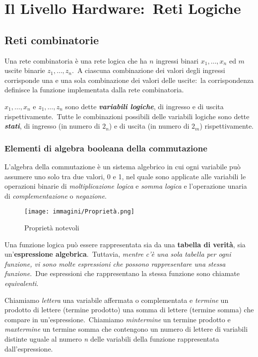 \chapter{Il Livello Hardware:\ Reti Logiche}

\section{Reti combinatorie}

Una rete combinatoria è una rete logica che ha $n$ ingressi binari $x_1, \dots, x_n$ ed $m$ uscite binarie $z_1, \dots, z_n$.\
A ciascuna combinazione dei valori degli ingressi corrisponde una e una sola combinazione dei valori delle uscite:\ la corrispondenza definisce la funzione implementata dalla rete combinatoria.

$x_1, \dots, x_n$ e $z_1, \dots, z_n$ sono dette \textbf{\textit{variabili logiche}}, di ingresso e di uscita rispettivamente.\
Tutte le combinazioni possibili delle variabili logiche sono dette \textbf{\textit{stati}}, di ingresso (in numero di $2_n$) e di uscita (in numero di $2_m$) rispettivamente.

\subsection{Elementi di algebra booleana della commutazione}

L'algebra della commutazione è un sistema algebrico in cui ogni variabile può assumere uno solo tra due valori, 0 e 1, nel quale sono applicate alle variabili le operazioni binarie di \textit{moltiplicazione logica} e \textit{somma logica} e l'operazione unaria di \textit{complementazione} o \textit{negazione}.

\begin{figure}[H]
    \centering
    \texttt{[image: immagini/Proprietà.png]}
    \caption*{Proprietà notevoli}
\end{figure}

\noindent Una funzione logica può essere rappresentata sia da una \textbf{tabella di verità}, sia un'\textbf{espressione algebrica}.\
Tuttavia, \textit{mentre c'è una sola tabella per ogni funzione, vi sono molte espressioni che possono rappresentare una stessa funzione}.\
Due espressioni che rappresentano la stessa funzione sono chiamate \textit{equivalenti}.

Chiamiamo \textit{lettera} una variabile affermata o complementata e \textit{termine} un prodotto di lettere (termine prodotto) una somma di lettere (termine somma) che compare in un'espressione.\
Chiamiamo \textit{mintermine} un termine prodotto e \textit{maxtermine} un termine somma che contengono un numero di lettere di variabili distinte uguale al numero \textit{n} delle variabili della funzione rappresentata dall'espressione.

